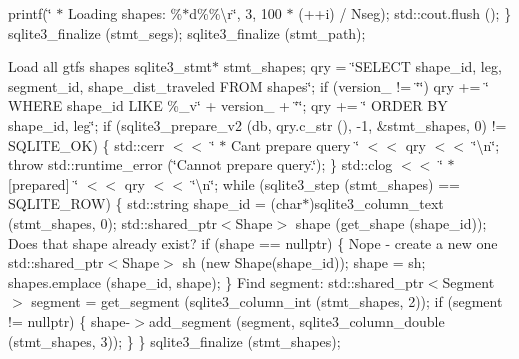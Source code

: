 printf(\char`\"{} $\ast$ Loading shapes\+: \%$\ast$d\%\%\textbackslash{}r\char`\"{}, 3, 100 $\ast$ (++i) / Nseg); std\+::cout.\+flush (); \} sqlite3\+\_\+finalize (stmt\+\_\+segs); sqlite3\+\_\+finalize (stmt\+\_\+path);

Load all gtfs {\ttfamily shapes} sqlite3\+\_\+stmt$\ast$ stmt\+\_\+shapes; qry = \char`\"{}\+S\+E\+L\+E\+C\+T shape\+\_\+id, leg, segment\+\_\+id, shape\+\_\+dist\+\_\+traveled F\+R\+O\+M shapes\char`\"{}; if (version\+\_\+ != \char`\"{}\char`\"{}) qry += \char`\"{} W\+H\+E\+R\+E shape\+\_\+id L\+I\+K\+E \textquotesingle{}\%\+\_\+v\char`\"{} + version\+\_\+ + \char`\"{}\textquotesingle{}\char`\"{}; qry += \char`\"{} O\+R\+D\+E\+R B\+Y shape\+\_\+id, leg\char`\"{}; if (sqlite3\+\_\+prepare\+\_\+v2 (db, qry.\+c\+\_\+str (), -\/1, \&stmt\+\_\+shapes, 0) != S\+Q\+L\+I\+T\+E\+\_\+\+OK) \{ std\+::cerr $<$$<$ \char`\"{} $\ast$ Can\textquotesingle{}t prepare query \char`\"{} $<$$<$ qry $<$$<$ \char`\"{}\textbackslash{}n\char`\"{}; throw std\+::runtime\+\_\+error (\char`\"{}\+Cannot prepare query.\char`\"{}); \} std\+::clog $<$$<$ \char`\"{} $\ast$ \mbox{[}prepared\mbox{]} \char`\"{} $<$$<$ qry $<$$<$ \char`\"{}\textbackslash{}n\char`\"{}; while (sqlite3\+\_\+step (stmt\+\_\+shapes) == S\+Q\+L\+I\+T\+E\+\_\+\+R\+OW) \{ std\+::string shape\+\_\+id = (char$\ast$)sqlite3\+\_\+column\+\_\+text (stmt\+\_\+shapes, 0); std\+::shared\+\_\+ptr$<$\+Shape$>$ shape (get\+\_\+shape (shape\+\_\+id)); Does that shape already exist? if (shape == nullptr) \{ Nope -\/ create a new one std\+::shared\+\_\+ptr$<$\+Shape$>$ sh (new Shape(shape\+\_\+id)); shape = sh; shapes.\+emplace (shape\+\_\+id, shape); \} Find segment\+: std\+::shared\+\_\+ptr$<$\+Segment$>$ segment = get\+\_\+segment (sqlite3\+\_\+column\+\_\+int (stmt\+\_\+shapes, 2)); if (segment != nullptr) \{ shape-\/$>$add\+\_\+segment (segment, sqlite3\+\_\+column\+\_\+double (stmt\+\_\+shapes, 3)); \} \} sqlite3\+\_\+finalize (stmt\+\_\+shapes);

